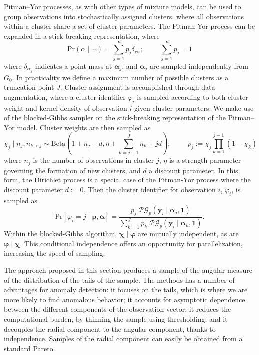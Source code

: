 Pitman--Yor processes, as with other types of mixture models, can be used to group 
    observations into stochastically assigned clusters, where all observations
    within a cluster share a set of cluster parameters.  The Pitman-Yor process
    can be expanded in a stick-breaking representation, where
    \[
        \text{Pr}(\alpha\mid\cdots) = \sum_{j = 1}^{\infty}p_j\delta_{\bm{\alpha}_j};
        \hspace{1cm}\sum_{j = 1}^{\infty}p_j = 1
    \]
    where $\delta_{\bm{\alpha}_j}$ indicates a point mass at $\bm{\alpha}_j$,
    and $\bm{\alpha}_j$ are sampled independently from $G_0$.
    In practicality we define a maximum number of possible clusters as a 
    truncation point $J$.  Cluster assignment is accomplished through data 
    augmentation, where a cluster identifier $\varphi_i$ is sampled according to
    both cluster weight and kernel density of observation $i$ given cluster parameters.
    We make use of the blocked-Gibbs sampler on the stick-breaking representation of the
    Pitman--Yor model.  Cluster weights are then sampled as
    \begin{equation}
        \label{eqn:clusterweight}
        \chi_{j} \mid n_j, n_{k>j} \sim \text{Beta}\left(1 + n_j - d, 
            \eta + \sum_{k = j + 1}^J n_k + jd\right);
        \hspace{1cm}p_j := \chi_j \prod_{k = 1}^{j-1}(1 - \chi_k)
    \end{equation}
    where $n_j$ is the number of observations in cluster $j$, $\eta$ is a strength 
    parameter governing the formation of new clusters, and $d$ a discount parameter.
    In this form, the Dirichlet process is a special case of the Pitman-Yor process
    where the discount parameter $d := 0$.
    Then the cluster identifier for observation $i$, $\varphi_i$, is sampled as
    \begin{equation}
        \label{eqn:clusterid}
        \text{Pr}\left[\varphi_i = j\mid \bm{p},\bm{\alpha}\right] =
            \frac{p_j\;\mathcal{PG}_p\left(\bm{y}_i\mid\bm{\alpha}_j,\bm{1}\right)}{
                \sum_{k = 1}^J p_k\;
                \mathcal{PG}_p\left(\bm{y}_i\mid\bm{\alpha}_k,\bm{1}\right)}.
    \end{equation}
    Within the blocked-Gibbs algorithm, $\bm{\chi}\mid\bm{\varphi}$ are mutually
    independent, as are $\bm{\varphi}\mid\bm{\chi}$.  This conditional independence
    offers an opportunity for parallelization, increasing the speed of sampling.
    
The approach proposed in this section produces a sample of the angular measure 
    of the distribution of the tails of the sample. The methods has a number of 
    advantages for anomaly detection: it focuses on the tails, which is where we 
    are more likely to find anomalous behavior;  it accounts for asymptotic 
    dependence between the different components of the observation vector; it
    reduces the computational burden, by thinning the sample using thresholding; 
    and it decouples the radial component to the angular component, thanks to 
    independence. Samples of the radial component can easily be obtained from a 
    standard Pareto.

